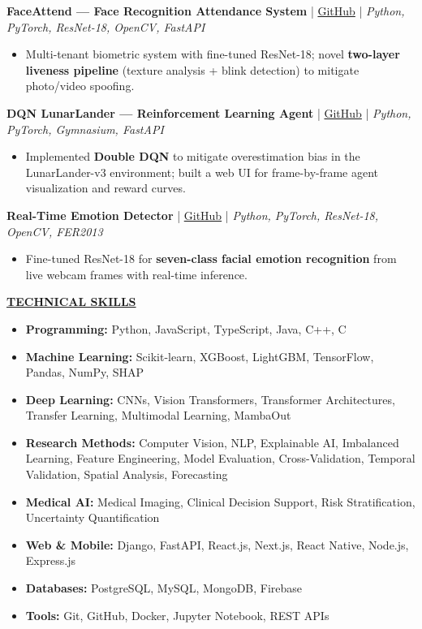 \documentclass[10.5pt,letterpaper]{article}
\newcommand{\sectiontitle}[1]{\vspace{7pt}\noindent\underline{\textbf{#1}}\vspace{5pt}\par}
\begin{document}
\textbf{FaceAttend --- Face Recognition Attendance System} \; | \; \href{https://github.com/ayanchyaziz123/face-recognition-api}{GitHub} \; | \; \textit{Python, PyTorch, ResNet-18, OpenCV, FastAPI}
\begin{itemize}
  \item Multi-tenant biometric system with fine-tuned ResNet-18; novel \textbf{two-layer liveness pipeline} (texture analysis + blink detection) to mitigate photo/video spoofing.
\end{itemize}

\textbf{DQN LunarLander --- Reinforcement Learning Agent} \; | \; \href{https://github.com/ayanchyaziz123/dqn-lunarlander}{GitHub} \; | \; \textit{Python, PyTorch, Gymnasium, FastAPI}
\begin{itemize}
  \item Implemented \textbf{Double DQN} to mitigate overestimation bias in the LunarLander-v3 environment; built a web UI for frame-by-frame agent visualization and reward curves.
\end{itemize}

\textbf{Real-Time Emotion Detector} \; | \; \href{https://github.com/ayanchyaziz123/Real-time-facial-expression-recognition}{GitHub} \; | \; \textit{Python, PyTorch, ResNet-18, OpenCV, FER2013}
\begin{itemize}
  \item Fine-tuned ResNet-18 for \textbf{seven-class facial emotion recognition} from live webcam frames with real-time inference.
\end{itemize}

\sectiontitle{TECHNICAL SKILLS}
\begin{itemize}
  \item \textbf{Programming:} Python, JavaScript, TypeScript, Java, C++, C
  \item \textbf{Machine Learning:} Scikit-learn, XGBoost, LightGBM, TensorFlow, Pandas, NumPy, SHAP
  \item \textbf{Deep Learning:} CNNs, Vision Transformers, Transformer Architectures, Transfer Learning, Multimodal Learning, MambaOut
  \item \textbf{Research Methods:} Computer Vision, NLP, Explainable AI, Imbalanced Learning, Feature Engineering, Model Evaluation, Cross-Validation, Temporal Validation, Spatial Analysis, Forecasting
  \item \textbf{Medical AI:} Medical Imaging, Clinical Decision Support, Risk Stratification, Uncertainty Quantification
  \item \textbf{Web \& Mobile:} Django, FastAPI, React.js, Next.js, React Native, Node.js, Express.js
  \item \textbf{Databases:} PostgreSQL, MySQL, MongoDB, Firebase
  \item \textbf{Tools:} Git, GitHub, Docker, Jupyter Notebook, REST APIs
\end{itemize}
\end{document}

